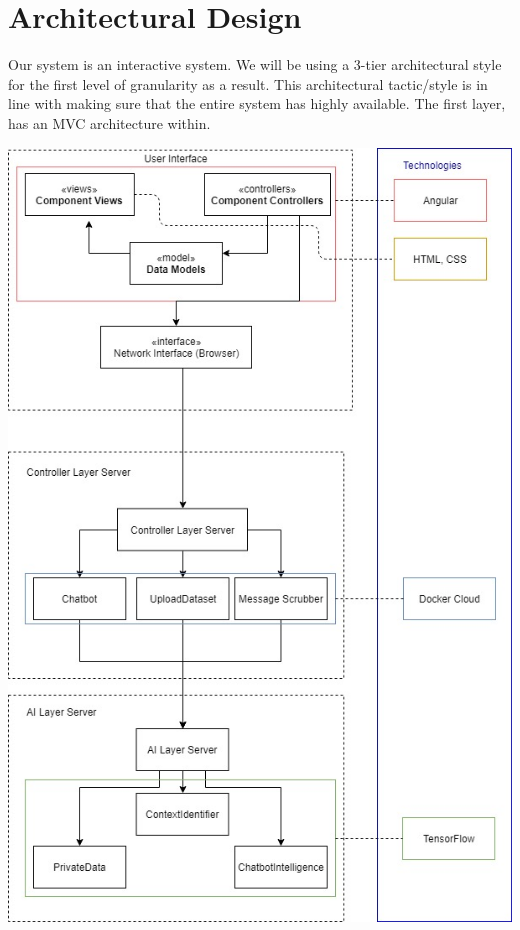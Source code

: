 \documentclass[11pt]{article}
\begin{document}
\section{Architectural Design}
Our system is an interactive system. We will be using a 3-tier architectural style for the first level of granularity as a result. This architectural tactic/style is in line with making sure that the entire system has highly available. The first layer, has an MVC architecture within.

\includegraphics[width=1.0\textwidth]{../../images/Botic_Simplified_Architectural_Design.jpg}
\end{document}
